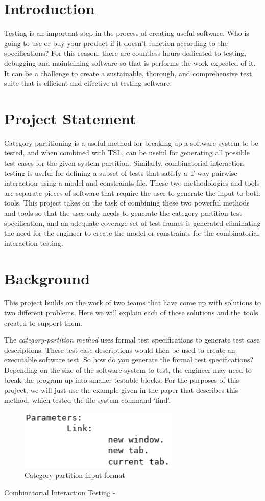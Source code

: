 \documentclass[12pt]{article}
\begin{document}
\maketitle
\section{Introduction}
Testing is an important step in the process of creating useful software. Who is
  going to use or buy your product if it doesn’t function according to the 
  specifications?  For this reason, there are countless hours dedicated to 
  testing, debugging and maintaining software so that is performs the work 
  expected of it. It can be a challenge to create a sustainable, thorough, and 
  comprehensive test suite that is efficient and effective at testing software.
\section{Project Statement}
Category partitioning is a useful method for breaking up a software system to be
  tested, and when combined with TSL, can be useful for generating all possible 
  test cases for the given system partition. Similarly, combinatorial 
  interaction testing is useful for defining a subset of tests that satisfy a 
  T-way pairwise interaction using a model and constraints file. These two 
  methodologies and tools are separate pieces of software that require the user 
  to generate the input to both tools. This project takes on the task of 
  combining these two powerful methods and tools so that the user only needs to 
  generate the category partition test specification, and an adequate coverage 
  set of test frames is generated eliminating the need for the engineer to 
  create the model or constraints for the combinatorial interaction testing.
\section{Background}
This project builds on the work of two teams that have come up with solutions to
  two different problems. Here we will explain each of those solutions and the 
  tools created to support them.

The \emph{category-partition method} uses formal test specifications to generate
  test case descriptions. These test case descriptions would then be used to
  create an executable software test. So how do you generate the formal test 
  specifications? Depending on the size of the software system to test, the 
  engineer may need to break the program up into smaller testable blocks. For 
  the purposes of this project, we will just use the example given in the paper 
  that describes this method, which tested the file system command ‘find’.

\begin{figure}[-htb]
\centering
\includegraphics[width=3in,keepaspectratio]{tsl_input.png}
\caption{Category partition input format}
\label{fig:tsl_input}
\end{figure}

Combinatorial Interaction Testing -
\end{document}
